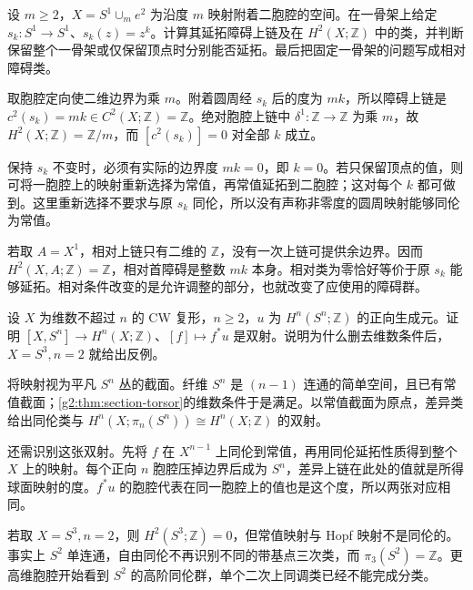\begin{exercise}\label{g2:ex:obstruction-cochain-versus-class}
	设 \(m\ge2\)，\(X=S^1\cup_m e^2\) 为沿度 \(m\) 映射附着二胞腔的空间。在一骨架上给定 \(s_k:S^1\to S^1\)、\(s_k(z)=z^k\)。计算其延拓障碍上链及在 \(H^2(X;\mathbb Z)\) 中的类，并判断保留整个一骨架或仅保留顶点时分别能否延拓。最后把固定一骨架的问题写成相对障碍类。
\end{exercise}
\begin{solution}
	取胞腔定向使二维边界为乘 \(m\)。附着圆周经 \(s_k\) 后的度为 \(mk\)，所以障碍上链是 \(c^2(s_k)=mk\in C^2(X;\mathbb Z)=\mathbb Z\)。绝对胞腔上链中 \(\delta^1:\mathbb Z\to\mathbb Z\) 为乘 \(m\)，故 \(H^2(X;\mathbb Z)=\mathbb Z/m\)，而 \([c^2(s_k)]=0\) 对全部 \(k\) 成立。

	保持 \(s_k\) 不变时，必须有实际的边界度 \(mk=0\)，即 \(k=0\)。若只保留顶点的值，则可将一胞腔上的映射重新选择为常值，再常值延拓到二胞腔；这对每个 \(k\) 都可做到。这里重新选择不要求与原 \(s_k\) 同伦，所以没有声称非零度的圆周映射能够同伦为常值。

	若取 \(A=X^1\)，相对上链只有二维的 \(\mathbb Z\)，没有一次上链可提供余边界。因而 \(H^2(X,A;\mathbb Z)=\mathbb Z\)，相对首障碍是整数 \(mk\) 本身。相对类为零恰好等价于原 \(s_k\) 能够延拓。相对条件改变的是允许调整的部分，也就改变了应使用的障碍群。
\end{solution}

\begin{exercise}\label{g2:ex:maps-to-sphere-top-dimension}
	设 \(X\) 为维数不超过 \(n\) 的 CW 复形，\(n\ge2\)，\(u\) 为 \(H^n(S^n;\mathbb Z)\) 的正向生成元。证明 \([X,S^n]\to H^n(X;\mathbb Z)\)、\([f]\mapsto f^*u\) 是双射。说明为什么删去维数条件后，\(X=S^3,n=2\) 就给出反例。
\end{exercise}
\begin{solution}
	将映射视为平凡 \(S^n\) 丛的截面。纤维 \(S^n\) 是 \((n-1)\) 连通的简单空间，且已有常值截面；\cref{g2:thm:section-torsor}的维数条件于是满足。以常值截面为原点，差异类给出同伦类与 \(H^n(X;\pi_n(S^n))\cong H^n(X;\mathbb Z)\) 的双射。

	还需识别这张双射。先将 \(f\) 在 \(X^{n-1}\) 上同伦到常值，再用同伦延拓性质得到整个 \(X\) 上的映射。每个正向 \(n\) 胞腔压掉边界后成为 \(S^n\)，差异上链在此处的值就是所得球面映射的度。\(f^*u\) 的胞腔代表在同一胞腔上的值也是这个度，所以两张对应相同。

	若取 \(X=S^3,n=2\)，则 \(H^2(S^3;\mathbb Z)=0\)，但常值映射与 Hopf 映射不是同伦的。事实上 \(S^2\) 单连通，自由同伦不再识别不同的带基点三次类，而 \(\pi_3(S^2)=\mathbb Z\)。更高维胞腔开始看到 \(S^2\) 的高阶同伦群，单个二次上同调类已经不能完成分类。
\end{solution}

